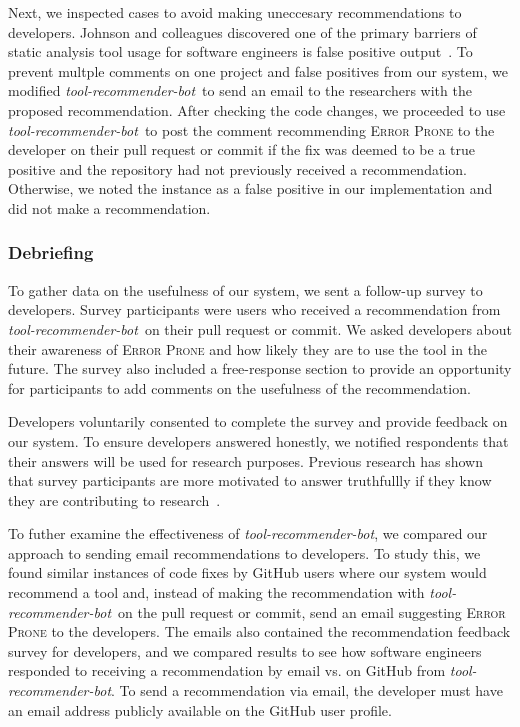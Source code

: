\documentclass[sigconf,review,anonymous]{acmart}
\newcommand{\tool}{\textsl{tool-recommender-bot}}
\begin{document}
Next, we inspected cases to avoid making uneccesary recommendations to developers. Johnson and colleagues discovered one of the primary barriers of static analysis tool usage for software engineers is false positive output~\cite{Johnson2013Why}. To prevent multple comments on one project and false positives from our system, we modified \tool~to send an email to the researchers with the proposed recommendation. After checking the code changes, we proceeded to use \tool~to post the comment recommending \textsc{Error Prone} to the developer on their pull request or commit if the fix was deemed to be a true positive and the repository had not previously received a recommendation. Otherwise, we noted the instance as a false positive in our implementation and did not make a recommendation.

\subsubsection{Debriefing}

To gather data on the usefulness of our system, we sent a follow-up survey to developers. Survey participants were users who received a recommendation from \tool~on their pull request or commit. We asked developers about their awareness of \textsc{Error Prone} and how likely they are to use the tool in the future. The survey also included a free-response section to provide an opportunity for participants to add comments on the usefulness of the recommendation.

Developers voluntarily consented to complete the survey and provide feedback on our system. To ensure developers answered honestly, we notified respondents that their answers will be used for research purposes. Previous research has shown that survey participants are more motivated to answer truthfullly if they know they are contributing to research~\cite{Krosnick1991Research}. 

To futher examine the effectiveness of \tool, we compared our approach to sending email recommendations to developers. To study this, we found similar instances of code fixes by GitHub users where our system would recommend a tool and, instead of making the recommendation with \tool~on the pull request or commit, send an email suggesting \textsc{Error Prone} to the developers. The emails also contained the recommendation feedback survey for developers, and we compared results to see how software engineers responded to receiving a recommendation by email vs. on GitHub from \tool. To send a recommendation via email, the developer must have an email address publicly available on the GitHub user profile. 
\end{document}
